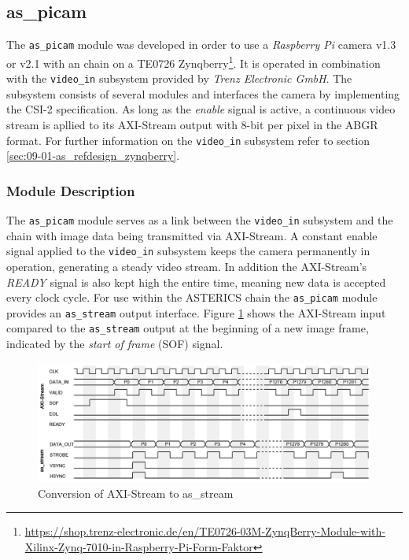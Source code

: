 

\subsection{as\_picam}


The \texttt{as\_picam} module was developed in order to use a \textit{Raspberry Pi} camera v1.3 or v2.1 with an \asterics chain on a TE0726 Zynqberry\footnote{\url{https://shop.trenz-electronic.de/en/TE0726-03M-ZynqBerry-Module-with-Xilinx-Zynq-7010-in-Raspberry-Pi-Form-Faktor}}. It is operated in combination with the \texttt{video\_in} subsystem provided by \textit{Trenz Electronic GmbH}. The subsystem consists of several modules and interfaces the camera by implementing the CSI-2 specification. As long as the \textit{enable} signal is active, a continuous video stream is apllied to its AXI-Stream output with 8-bit per pixel in the ABGR format.
For further information on the \texttt{video\_in} subsystem refer to section \ref{sec:09-01-as_refdesign_zynqberry}.

\subsubsection{Module Description}

The \texttt{as\_picam} module serves as a link between the \texttt{video\_in} subsystem and the \asterics chain with image data being transmitted via AXI-Stream. A constant enable signal applied to the \texttt{video\_in} subsystem keeps the camera permanently in operation, generating a steady video stream. In addition the AXI-Stream's \textit{READY} signal is also kept high the entire time, meaning new data is accepted every clock cycle. For use within the ASTERICS chain the \texttt{as\_picam} module provides an \texttt{as\_stream} output interface. Figure \ref{07-as-picam-wave} shows the AXI-Stream input compared to the \texttt{as\_stream} output at the beginning of a new image frame, indicated by the \textit{start of frame} (SOF) signal.

\begin{figure}[htbp]
    \noindent \begin{centering}
    \includegraphics[width=\textwidth]{figs/07-as_picam_wave.png}
    \par\end{centering}
    \caption{Conversion of AXI-Stream to as\_stream}
    \label{07-as-picam-wave}
\end{figure}

